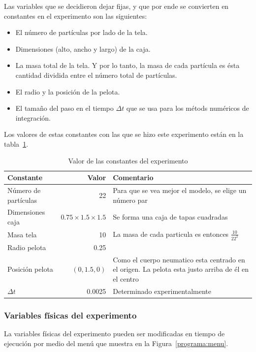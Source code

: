 Las variables que se decidieron dejar fijas, y que por ende se convierten en constantes en el experimento son las siguientes:

\begin{itemize}
 \item El número de partículas por lado de la tela.
 \item Dimensiones (alto, ancho y largo) de la caja.
 \item La masa total de la tela. Y por lo tanto, la masa de cada partícula es ésta cantidad dividida entre el número total de partículas.
 \item El radio y la posición de la pelota.
 \item El tamaño del paso en el tiempo $\Delta t$ que se usa para los métods numéricos de integración.
\end{itemize}

Los valores de estas constantes con las que se hizo este experimento están en la tabla~\ref{valores:constantes}.
\begin{table}
\begin{center}
\begin{tabular} {@{}lrp{10cm}@{}}
\toprule
Constante & Valor & Comentario\\ 
\midrule
 Número de partículas & 22 & Para que se vea mejor el modelo, se elige un número par\\
 Dimensiones caja & $0.75 \times 1.5 \times 1.5$ & Se forma una caja de tapas cuadradas \\
 Masa tela & 10 & La masa de cada particula es entonces $\frac{10}{22^{2}}$ \\
 Radio pelota & 0.25 &  \\
 Posición pelota & $(0, 1.5, 0)$& Como el cuerpo neumatico esta centrado en el origen. La pelota esta justo arriba de él en el centro\\
 $\Delta t$ & 0.0025 & Determinado experimentalmente \\
\bottomrule
\end{tabular}
\caption[Tabla con los valores de las constantes durante el experimento]{Valor de las constantes del experimento}
\label{valores:constantes}
\end{center}
\end{table}

\subsubsection{Variables físicas del experimento}
La variables físicas del experimento pueden ser modificadas en tiempo de ejecución por medio del menú que muestra en la Figura~\ref{programa:menu}.

